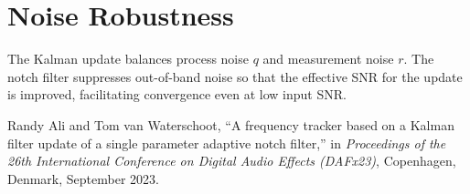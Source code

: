 \documentclass{article}
\begin{document}
\section{Noise Robustness}

The Kalman update balances process noise \(q\) and measurement noise \(r\).  The notch filter suppresses out-of-band noise so that the effective SNR for the update is improved, facilitating convergence even at low input SNR.

\begin{thebibliography}{9}
Randy Ali and Tom van Waterschoot,  
``A frequency tracker based on a Kalman filter update of a single parameter adaptive notch filter,''  
in \emph{Proceedings of the 26th International Conference on Digital Audio Effects (DAFx23)},  
Copenhagen, Denmark, September 2023.
\end{thebibliography}
\end{document}
